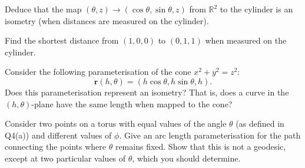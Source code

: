 \documentclass[answers]{exam}
\begin{document}
\begin{questions}
\begin{parts}
\begin{subparts}
\subpart%
Deduce that the map $(\theta, z) \to(\cos \theta, \sin \theta, z)$ from $\mathbb{R}^{2}$ to the cylinder is an isometry (when distances are measured on the cylinder).

\subpart%
Find the shortest distance from $(1,0,0)$ to $(0,1,1)$ when measured on the cylinder.
\end{subparts}
\end{parts}



\question%
Consider the following parameterisation of the cone $x^{2}+y^{2}=z^{2}$: \[
	\mathbf{r}(h, \theta)=(h \cos \theta, h \sin \theta, h) .
\] Does this parameterisation represent an isometry? That is, does a curve in the $(h,\theta)$-plane have the same length when mapped to the cone?



\question%



\question%
Consider two points on a torus with equal values of the angle $\theta$ (as defined in Q4(a)) and different values of $\phi$. Give an arc length parameterisation for the path connecting the points where $\theta$ remains fixed. Show that this is not a geodesic, except at two particular values of $\theta$, which you should determine.




\end{questions}
\end{document}

